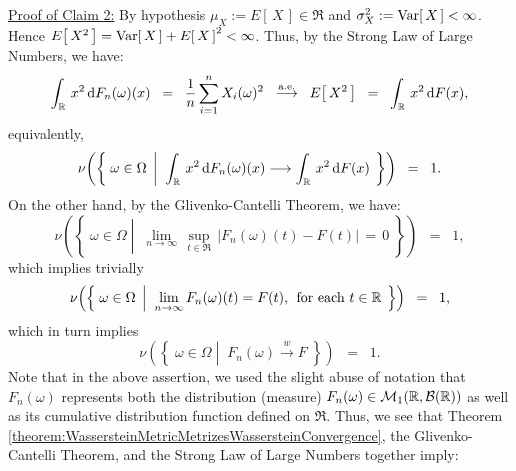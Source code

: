 \vskip 0.8cm
\noindent
\underline{Proof of Claim 2:}\;\;
By hypothesis $\mu_{X} := E\!\left[\,X\,\right] \in \Re$ and $\sigma^{2}_{X} := \Var\!\left[\,X\,\right] < \infty$.
Hence $E\!\left[\,X^{2}\,\right] = \Var\!\left[\,X\,\right] + E\!\left[\,X\,\right]^{2} < \infty$.
Thus, by the Strong Law of Large Numbers, we have:
\begin{equation*}
\int_{\Re}\,x^{2}\,\d F_{n}(\omega)(x)
\;\; = \;\; \dfrac{1}{n}\sum_{i=1}^{n}X_{i}(\omega)^{2}
\;\; \overset{\textnormal{a.e.}}{\longrightarrow} \;\; E\!\left[\,X^{2}\,\right]
\;\; = \;\; \int_{\Re}\,x^{2}\,\d F(x),
\end{equation*}
equivalently,
\begin{equation*}
\nu\!\left(\left\{\;
\omega \in \Omega
\;\left\vert\;\;
\int_{\Re}\,x^{2}\,\d F_{n}(\omega)(x) \longrightarrow \int_{\Re}\,x^{2}\,\d F(x)
\right.
\;\right\}\right)
\;\; = \;\;
1.
\end{equation*}
On the other hand, by the Glivenko-Cantelli Theorem, we have:
\begin{equation*}
\nu\!\left(\left\{\;
\omega \in \Omega
\;\left\vert\;\;
\lim_{n\rightarrow\infty}\,\sup_{t \in \Re}\,\left\vert F_{n}(\omega)(t) - F(t) \right\vert \,=\, 0
\right.
\;\right\}\right)
\;\; = \;\;
1,
\end{equation*}
which implies trivially
\begin{equation*}
\nu\!\left(\left\{\;
\omega \in \Omega
\;\left\vert\;\;
\lim_{n\rightarrow\infty}F_{n}(\omega)(t) = F(t),
\;\,\textnormal{for each $t\in\Re$}
\right.
\;\right\}\right)
\;\; = \;\;
1,
\end{equation*}
which in turn implies
\begin{equation*}
\nu\!\left(\left\{\;
\omega \in \Omega
\;\left\vert\;\;
F_{n}(\omega) \overset{w}{\longrightarrow} F
\right.
\;\right\}\right)
\;\; = \;\;
1.
\end{equation*}
Note that in the above assertion, we used the slight abuse of notation that $F_{n}(\omega)$ represents both
the distribution (measure) $F_{n}(\omega) \in \MoR$ as well as its cumulative distribution function defined on $\Re$.
Thus, we see that
Theorem \ref{theorem:WassersteinMetricMetrizesWassersteinConvergence},
the Glivenko-Cantelli Theorem, and
the Strong Law of Large Numbers together imply:
